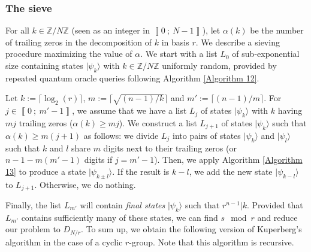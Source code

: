 \documentclass[a4paper,10pt,notitlepage]{report}
\theoremstyle{definition}
\theoremstyle{plain}
\theoremstyle{definition}
\newcommand{\Z}{\mathbb{Z}}
\renewcommand{\i}[2]{\left\llbracket #1~;~#2\right\rrbracket}
\renewcommand{\(}{\left(}
\renewcommand{\)}{\right)}
\begin{document}
\subsubsection{The sieve}

For all $k\in\Z/N\Z$ (seen as an integer in $\i{0}{N-1}$), let $\alpha(k)$ be the number of trailing zeros in the decomposition of $k$ in basis $r$. We describe a sieving procedure maximizing the value of $\alpha$. We start with a list $L_0$ of sub-exponential size containing states $|\psi_k\rangle$ with $k\in\Z/N\Z$ uniformly random, provided by repeated quantum oracle queries following Algorithm \ref{Algorithm 12}.  

Let $k:=\lceil\log_2(r)\rceil$, $m:=\lceil \sqrt{(n-1)/k}\rceil$ and $m':=\lceil (n-1)/m\rceil$. For $j\in\i{0}{m'-1}$, we assume that we have a list $L_j$ of states $|\psi_k\rangle$ with $k$ having $mj$ trailing zeros ($\alpha(k)\geq mj$). We construct a list $L_{j+1}$ of states $|\psi_k\rangle$ such that $\alpha(k)\geq m(j+1)$ as follows: we divide $L_j$ into pairs of states $|\psi_k\rangle$ and $|\psi_l\rangle$ such that $k$ and $l$ share $m$ digits next to their trailing zeros (or $n-1-m(m'-1)$ digits if $j=m'-1$). Then, we apply Algorithm \ref{Algorithm 13} to produce a state $|\psi_{k\pm l}\rangle$. If the result is $k-l$, we add the new state $|\psi_{k-l}\rangle$ to $L_{j+1}$. Otherwise, we do nothing.  

Finally, the list $L_{m'}$ will contain \emph{final states} $|\psi_k\rangle$ such that $r^{n-1}|k$. Provided that $L_{m'}$ contains sufficiently many of these states, we can find $s \mod r$ and reduce our problem to $D_{N/r}$.  To sum up, we obtain the following version of Kuperberg's algorithm in the case of a cyclic $r$-group. Note that this algorithm is recursive.
\end{document}
